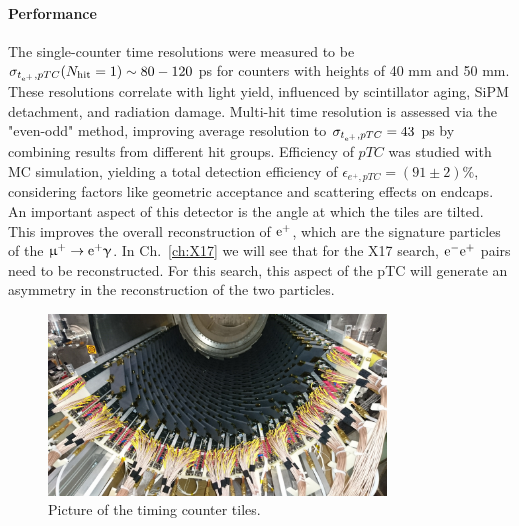 \begin{refsection}
        \paragraph{Performance} The single-counter time resolutions were measured to be $\sigma_{t_{\text{e}^+}, pTC}(N_{\text{hit}} = 1) \sim 80-120$ ps for counters with heights of 40 mm and 50 mm. These resolutions correlate with light yield, influenced by scintillator aging, SiPM detachment, and radiation damage.
        Multi-hit time resolution is assessed via the "even-odd" method, improving average resolution to $\sigma_{t_{\text{e}^+}, pTC} = 43$ ps by combining results from different hit groups. 
        Efficiency of $pTC$ was studied with MC simulation, yielding a total detection efficiency of $\epsilon_{e^+, pTC} = (91 \pm 2)\%$, considering factors like geometric acceptance and scattering effects on endcaps.\\

        \noindent
        An important aspect of this detector is the angle at which the tiles are tilted.
        This improves the overall reconstruction of $\text{e}^+$, which are the signature particles of the $\upmu^+ \rightarrow \text{e}^+ \upgamma$.
        In Ch.~\ref{ch:X17} we will see that for the X17 search, $\text{e}^- \text{e}^+$ pairs need to be reconstructed. 
        For this search, this aspect of the pTC will generate an asymmetry in the reconstruction of the two particles. 

        \begin{figure}
            \centering
            \includegraphics[width = 0.8\textwidth]{Figures/MEG/pTC.png}
            \caption[pTC: picture]{Picture of the timing counter tiles.}
            \label{fig:MEGII:pTC}
        \end{figure}


\end{refsection}
